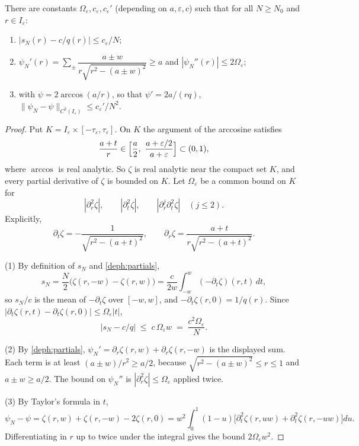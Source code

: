 \begin{lemma}\label{deph:reg}
There are constants $\Omega_\varepsilon,c_\varepsilon,c_\varepsilon'$ (depending on $a,\varepsilon,c$) such that for all $N\ge N_0$ and $r\in I_\varepsilon$:
\begin{enumerate}
\item $|s_N(r)-c/q(r)|\le c_\varepsilon/N$;
\item $\psi_N'(r)=\sum_\pm\dfrac{a\pm w}{r\sqrt{r^2-(a\pm w)^2}}\ge a$ and $|\psi_N''(r)|\le 2\Omega_\varepsilon$;
\item with $\psi=2\arccos(a/r)$, so that $\psi'=2a/(rq)$,
$\|\psi_N-\psi\|_{C^2(I_\varepsilon)}\le c_\varepsilon'/N^2$.
\end{enumerate}
\end{lemma}

\begin{proof}
Put $K=I_\varepsilon\times[-\tau_\varepsilon,\tau_\varepsilon]$. On $K$ the argument of the arccosine satisfies
\[
\frac{a+t}{r}\in\Bigl[\frac a2,\ \frac{a+\varepsilon/2}{a+\varepsilon}\Bigr]\subset(0,1),
\]
where $\arccos$ is real analytic. So $\zeta$ is real analytic near the compact set $K$, and every partial derivative of $\zeta$ is bounded on $K$.
Let $\Omega_\varepsilon$ be a common bound on $K$ for
\[
|\partial_r^2\zeta|,\qquad |\partial_t^2\zeta|,\qquad |\partial_r^j\partial_t^2\zeta|\quad(j\le2).
\]
Explicitly,
\begin{equation}\label{deph:partials}
\partial_t\zeta=-\frac{1}{\sqrt{r^2-(a+t)^2}},\qquad
\partial_r\zeta=\frac{a+t}{r\sqrt{r^2-(a+t)^2}} .
\end{equation}

(1) By definition of $s_N$ and \eqref{deph:partials},
\[
s_N=\frac{N}{2}\bigl(\zeta(r,-w)-\zeta(r,w)\bigr)=\frac c{2w}\int_{-w}^{w}(-\partial_t\zeta)(r,t)\,dt ,
\]
so $s_N/c$ is the mean of $-\partial_t\zeta$ over $[-w,w]$, and $-\partial_t\zeta(r,0)=1/q(r)$. Since $|\partial_t\zeta(r,t)-\partial_t\zeta(r,0)|\le \Omega_\varepsilon|t|$,
\[
|s_N-c/q|\;\le\; c\,\Omega_\varepsilon w\;=\;\frac{c^2\Omega_\varepsilon}{N}.
\]

(2) By \eqref{deph:partials}, $\psi_N'=\partial_r\zeta(r,w)+\partial_r\zeta(r,-w)$ is the displayed sum. Each term is at least $(a\pm w)/r^2\ge a/2$, because $\sqrt{r^2-(a\pm w)^2}\le r\le1$ and
$a\pm w\ge a/2$. The bound on $\psi_N''$ is $|\partial_r^2\zeta|\le \Omega_\varepsilon$ applied twice.

(3) By Taylor's formula in $t$,
\[
\psi_N-\psi=\zeta(r,w)+\zeta(r,-w)-2\zeta(r,0)=w^2\int_0^1(1-u)\bigl[\partial_t^2\zeta(r,uw)+\partial_t^2\zeta(r,-uw)\bigr]du .
\]
Differentiating in $r$ up to twice under the integral gives the bound $2\Omega_\varepsilon w^2$.
\end{proof}

